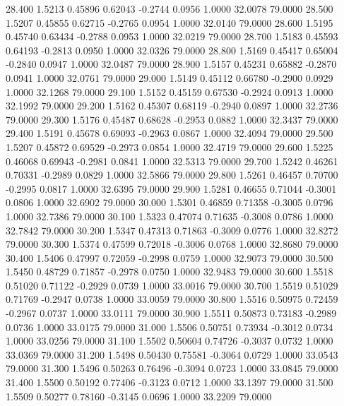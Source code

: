   28.400   1.5213   0.45896   0.62043  -0.2744   0.0956   1.0000  32.0078  79.0000
  28.500   1.5207   0.45855   0.62715  -0.2765   0.0954   1.0000  32.0140  79.0000
  28.600   1.5195   0.45740   0.63434  -0.2788   0.0953   1.0000  32.0219  79.0000
  28.700   1.5183   0.45593   0.64193  -0.2813   0.0950   1.0000  32.0326  79.0000
  28.800   1.5169   0.45417   0.65004  -0.2840   0.0947   1.0000  32.0487  79.0000
  28.900   1.5157   0.45231   0.65882  -0.2870   0.0941   1.0000  32.0761  79.0000
  29.000   1.5149   0.45112   0.66780  -0.2900   0.0929   1.0000  32.1268  79.0000
  29.100   1.5152   0.45159   0.67530  -0.2924   0.0913   1.0000  32.1992  79.0000
  29.200   1.5162   0.45307   0.68119  -0.2940   0.0897   1.0000  32.2736  79.0000
  29.300   1.5176   0.45487   0.68628  -0.2953   0.0882   1.0000  32.3437  79.0000
  29.400   1.5191   0.45678   0.69093  -0.2963   0.0867   1.0000  32.4094  79.0000
  29.500   1.5207   0.45872   0.69529  -0.2973   0.0854   1.0000  32.4719  79.0000
  29.600   1.5225   0.46068   0.69943  -0.2981   0.0841   1.0000  32.5313  79.0000
  29.700   1.5242   0.46261   0.70331  -0.2989   0.0829   1.0000  32.5866  79.0000
  29.800   1.5261   0.46457   0.70700  -0.2995   0.0817   1.0000  32.6395  79.0000
  29.900   1.5281   0.46655   0.71044  -0.3001   0.0806   1.0000  32.6902  79.0000
  30.000   1.5301   0.46859   0.71358  -0.3005   0.0796   1.0000  32.7386  79.0000
  30.100   1.5323   0.47074   0.71635  -0.3008   0.0786   1.0000  32.7842  79.0000
  30.200   1.5347   0.47313   0.71863  -0.3009   0.0776   1.0000  32.8272  79.0000
  30.300   1.5374   0.47599   0.72018  -0.3006   0.0768   1.0000  32.8680  79.0000
  30.400   1.5406   0.47997   0.72059  -0.2998   0.0759   1.0000  32.9073  79.0000
  30.500   1.5450   0.48729   0.71857  -0.2978   0.0750   1.0000  32.9483  79.0000
  30.600   1.5518   0.51020   0.71122  -0.2929   0.0739   1.0000  33.0016  79.0000
  30.700   1.5519   0.51029   0.71769  -0.2947   0.0738   1.0000  33.0059  79.0000
  30.800   1.5516   0.50975   0.72459  -0.2967   0.0737   1.0000  33.0111  79.0000
  30.900   1.5511   0.50873   0.73183  -0.2989   0.0736   1.0000  33.0175  79.0000
  31.000   1.5506   0.50751   0.73934  -0.3012   0.0734   1.0000  33.0256  79.0000
  31.100   1.5502   0.50604   0.74726  -0.3037   0.0732   1.0000  33.0369  79.0000
  31.200   1.5498   0.50430   0.75581  -0.3064   0.0729   1.0000  33.0543  79.0000
  31.300   1.5496   0.50263   0.76496  -0.3094   0.0723   1.0000  33.0845  79.0000
  31.400   1.5500   0.50192   0.77406  -0.3123   0.0712   1.0000  33.1397  79.0000
  31.500   1.5509   0.50277   0.78160  -0.3145   0.0696   1.0000  33.2209  79.0000
